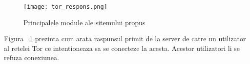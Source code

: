 \begin{figure}[h]
	\centering
	\texttt{[image: tor\_respons.png]}
	\caption{Principalele module ale sitemului propus}
	\label{fig:tor_respons}
\end{figure}
Figura ~\ref{fig:tor_respons} prezinta cum arata raspunsul primit de la server de catre un utilizator al retelei Tor ce intentioneaza sa se conecteze la acesta. Acestor utilizatori li se refuza conexiunea. \\


%
%
%
%
%
%  
%    
%    
